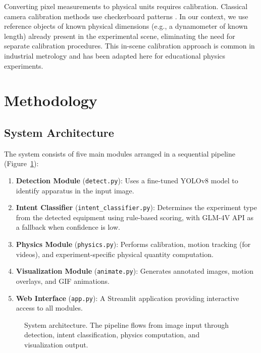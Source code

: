 \documentclass[12pt]{article}
\begin{document}
Converting pixel measurements to physical units requires calibration. Classical camera calibration methods use checkerboard patterns \cite{zhang2000calibration}. In our context, we use reference objects of known physical dimensions (e.g., a dynamometer of known length) already present in the experimental scene, eliminating the need for separate calibration procedures. This in-scene calibration approach is common in industrial metrology and has been adapted here for educational physics experiments.

\section{Methodology}

\subsection{System Architecture}

The system consists of five main modules arranged in a sequential pipeline (Figure~\ref{fig:architecture}):

\begin{enumerate}[noitemsep]
  \item \textbf{Detection Module} (\texttt{detect.py}): Uses a fine-tuned YOLOv8 model to identify apparatus in the input image.
  \item \textbf{Intent Classifier} (\texttt{intent\_classifier.py}): Determines the experiment type from the detected equipment using rule-based scoring, with GLM-4V API as a fallback when confidence is low.
  \item \textbf{Physics Module} (\texttt{physics.py}): Performs calibration, motion tracking (for videos), and experiment-specific physical quantity computation.
  \item \textbf{Visualization Module} (\texttt{animate.py}): Generates annotated images, motion overlays, and GIF animations.
  \item \textbf{Web Interface} (\texttt{app.py}): A Streamlit application providing interactive access to all modules.
\end{enumerate}

\begin{figure}[H]
  \centering
  \caption{System architecture. The pipeline flows from image input through detection, intent classification, physics computation, and visualization output.}
  \label{fig:architecture}
\end{figure}
\end{document}
